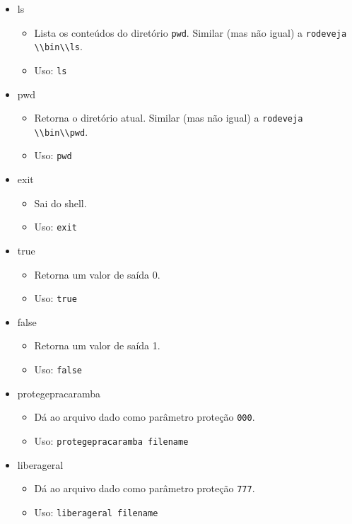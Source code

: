 \documentclass{amsart}
\theoremstyle{plain}
\newcommand{\code}[1]{\lstinline[mathescape=true]{#1}}
\newcommand{\mcode}[1]{\lstinline[mathescape]!#1!}
\begin{document}
\begin{itemize}
  \item ls
    \begin{itemize}
      \item Lista os conteúdos do diretório \code{pwd}. Similar (mas não igual) a \code{rodeveja
        \\bin\\ls}.
      \item Uso: \mcode{ls}
    \end{itemize}
  \item pwd
    \begin{itemize}
      \item Retorna o diretório atual. Similar (mas não igual) a \code{rodeveja \\bin\\pwd}.
      \item Uso: \mcode{pwd}
    \end{itemize}
  \item exit
    \begin{itemize}
      \item Sai do shell.
      \item Uso: \mcode{exit}
    \end{itemize}
  \item true
    \begin{itemize}
      \item Retorna um valor de saída 0.
      \item Uso: \mcode{true}
    \end{itemize}
  \item false
    \begin{itemize}
      \item Retorna um valor de saída 1.
      \item Uso: \mcode{false}
    \end{itemize}
  \item protegepracaramba
    \begin{itemize}
      \item Dá ao arquivo dado como parâmetro proteção \code{000}.
      \item Uso: \mcode{protegepracaramba filename}
    \end{itemize}
  \item liberageral
    \begin{itemize}
      \item Dá ao arquivo dado como parâmetro proteção \code{777}.
      \item Uso: \mcode{liberageral filename}

\end{itemize}
\end{itemize}
\end{document}
